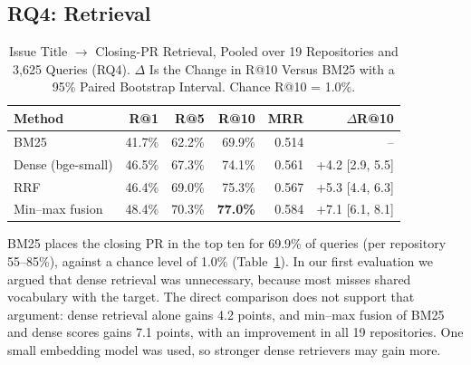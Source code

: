 \documentclass[conference]{IEEEtran}
\newcommand{\res}[1]{#1}
\begin{document}
\subsection{RQ4: Retrieval}
\begin{table}[t]
\caption{Issue Title $\rightarrow$ Closing-PR Retrieval, Pooled over 19 Repositories and \res{3{,}625} Queries (RQ4). $\Delta$ Is the Change in R@10 Versus BM25 with a 95\% Paired Bootstrap Interval. Chance R@10 = \res{1.0\%}.}
\label{tab:retrieval}
\centering
\scriptsize
\setlength{\tabcolsep}{3pt}
\begin{tabular}{lrrrrr}
\toprule
Method & R@1 & R@5 & R@10 & MRR & $\Delta$R@10 \\
\midrule
BM25 & \res{41.7\%} & \res{62.2\%} & \res{69.9\%} & \res{0.514} & -- \\
Dense (bge-small) & \res{46.5\%} & \res{67.3\%} & \res{74.1\%} & \res{0.561} & \res{+4.2} [\res{2.9, 5.5}] \\
RRF & \res{46.4\%} & \res{69.0\%} & \res{75.3\%} & \res{0.567} & \res{+5.3} [\res{4.4, 6.3}] \\
Min--max fusion & \res{48.4\%} & \res{70.3\%} & \textbf{\res{77.0\%}} & \res{0.584} & \res{+7.1} [\res{6.1, 8.1}] \\
\bottomrule
\end{tabular}
\end{table}

BM25 places the closing PR in the top ten for \res{69.9\%} of queries (per repository \res{55--85\%}), against a chance level of \res{1.0\%} (Table~\ref{tab:retrieval}). In our first evaluation we argued that dense retrieval was unnecessary, because most misses shared vocabulary with the target. The direct comparison does not support that argument: dense retrieval alone gains \res{4.2} points, and min--max fusion of BM25 and dense scores gains \res{7.1} points, with an improvement in all \res{19} repositories. One small embedding model was used, so stronger dense retrievers may gain more.
\end{document}

